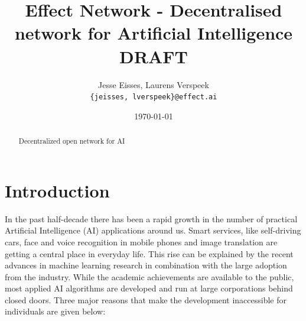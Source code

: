 \documentclass{article}
\title{Effect Network - Decentralised network for Artificial Intelligence \\ \vspace{16pt} \large \textbf{DRAFT}}
\date{\today}
\author{Jesse Eisses, Laurens Verspeek \\
  \small \texttt{\{jeisses, lverspeek\}@effect.ai}}
\begin{document}
\maketitle

\begin{abstract}
Decentralized open network for AI
\end{abstract}


\section{Introduction}
In the past half-decade there has been a rapid growth in the number of
practical Artificial Intelligence (AI) applications around us. Smart
services, like self-driving cars, face and voice recognition in mobile
phones and image translation are getting a central place in everyday
life. This rise can be explained by the recent advances in machine
learning research in combination with the large adoption from the
industry. While the academic achievements are available to the public,
most applied AI algorithms are developed and run at large corporations
behind closed doors. Three major reasons that make the development
inaccessible for individuals are given below:
\end{document}
